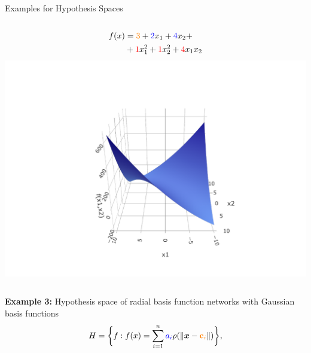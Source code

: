 \documentclass[11pt,compress,t,notes=noshow, xcolor=table]{beamer}
\begin{document}
\begin{vbframe}{Examples for Hypothesis Spaces}
\begin{columns}
  \begin{column}{0.33\textwidth}
    \begin{center}
      \begin{equation*}
        \begin{split}
          f(x) &= \textcolor{orange}{3} + \textcolor{blue}{2} x_1 + 
          \textcolor{blue}{4} x_2 + \\
          &+ \textcolor{red}{1} x_1^2 + \textcolor{red}{1} x_2^2 
          + \textcolor{red}{4} x_1 x_2
        \end{split}
      \end{equation*}
      \includegraphics[width=1.2\textwidth]{figure/hs-quadric-3.pdf}
    \end{center}
  \end{column}

  \normalsize
  
\end{columns}

\framebreak

\textbf{Example 3:} Hypothesis space of radial basis function networks with
Gaussian basis functions
$$H = \bigg\{ f: f(x) =  \sum_{i=1}^n \textcolor{blue}{a_i} \rho ( \| \bm{x} - 
\textcolor{orange}{\textbf{c}_i}  \|) 
\bigg\},$$ 


\end{vbframe}
\end{document}
